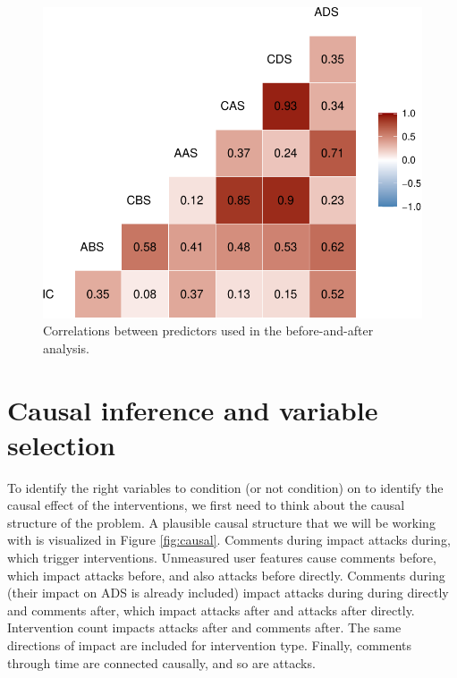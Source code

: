 \documentclass[
  10pt,
  dvipsnames, enabledeprecatedfontcommands]{scrartcl}
\begin{document}
\begin{figure}[H]

\begin{center}\includegraphics[width=1\linewidth]{technicalReport4_files/figure-latex/correlations-1} \end{center}
\caption{Correlations between predictors used in the before-and-after analysis.}
\label{fig:correlations}
\end{figure}

\hypertarget{causal-inference-and-variable-selection}{%
\section{Causal inference and variable
selection}\label{causal-inference-and-variable-selection}}

To identify the right variables to condition (or not condition) on to
identify the causal effect of the interventions, we first need to think
about the causal structure of the problem. A plausible causal structure
that we will be working with is visualized in Figure \ref{fig:causal}.
Comments during impact attacks during, which trigger interventions.
Unmeasured user features cause comments before, which impact attacks
before, and also attacks before directly. Comments during (their impact
on ADS is already included) impact attacks during during directly and
comments after, which impact attacks after and attacks after directly.
Intervention count impacts attacks after and comments after. The same
directions of impact are included for intervention type. Finally,
comments through time are connected causally, and so are attacks.
\end{document}

